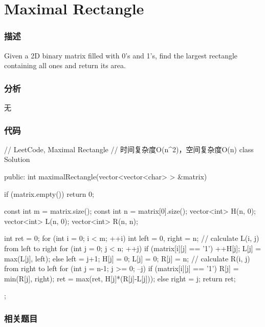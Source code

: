 \section{Maximal Rectangle} %
\label{sec:maximal-rectangle}


\subsubsection{描述}
Given a 2D binary matrix filled with 0's and 1's, find the largest rectangle containing all ones and return its area.


\subsubsection{分析}
无


\subsubsection{代码}
\begin{Code}
// LeetCode, Maximal Rectangle
// 时间复杂度O(n^2)，空间复杂度O(n)
class Solution {
public:
    int maximalRectangle(vector<vector<char> > &matrix) {
        if (matrix.empty())  return 0;

        const int m = matrix.size();
        const int n = matrix[0].size();
        vector<int> H(n, 0);
        vector<int> L(n, 0);
        vector<int> R(n, n);

        int ret = 0;
        for (int i = 0; i < m; ++i) {
            int left = 0, right = n;
            // calculate L(i, j) from left to right
            for (int j = 0; j < n; ++j) {
                if (matrix[i][j] == '1') {
                    ++H[j];
                    L[j] = max(L[j], left);
                } else {
                    left = j+1;
                    H[j] = 0; L[j] = 0; R[j] = n;
                }
            }
            // calculate R(i, j) from right to left
            for (int j = n-1; j >= 0; --j) {
                if (matrix[i][j] == '1') {
                    R[j] = min(R[j], right);
                    ret = max(ret, H[j]*(R[j]-L[j]));
                } else {
                    right = j;
                }
            }
        }
        return ret;
    }
};
\end{Code}


\subsubsection{相关题目}

